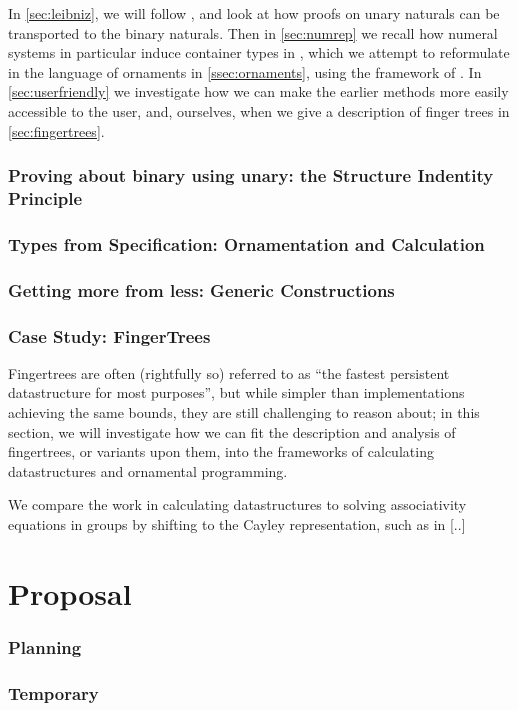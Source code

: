 \documentclass{article}
\theoremstyle{plain}%
\theoremstyle{definition}
\begin{document}
In \autoref{sec:leibniz}, we will follow \cite{iri}, and look at how proofs on unary naturals can be transported to the binary naturals. Then in \autoref{sec:numrep} we recall how numeral systems in particular induce container types in \cite{calcdata}, which we attempt to reformulate in the language of ornaments in \autoref{ssec:ornaments}, using the framework of \cite{progorn}. In \autoref{sec:userfriendly} we investigate how we can make the earlier methods more easily accessible to the user, and, ourselves, when we give a description of finger trees in \autoref{sec:fingertrees}.


\section{Proving about binary using unary: the Structure Indentity Principle}\label{sec:leibniz}


\section{Types from Specification: Ornamentation and Calculation}\label{sec:numrep}


\section{Getting more from less: Generic Constructions}\label{sec:userfriendly}


\section{Case Study: FingerTrees}\label{sec:fingertrees}
Fingertrees are often (rightfully so) referred to as ``the fastest persistent datastructure for most purposes'', but while simpler than implementations achieving the same bounds, they are still challenging to reason about; in this section, we will investigate how we can fit the description and analysis of fingertrees, or variants upon them, into the frameworks of calculating datastructures and ornamental programming.

We compare the work in calculating datastructures to solving associativity equations in groups by shifting to the Cayley representation, such as in [..]




\part{Proposal}

\section{Planning}


\newpage
\section{Temporary}\label{sec:temp}
\listoftodos
%


\printbibliography
\end{document}
